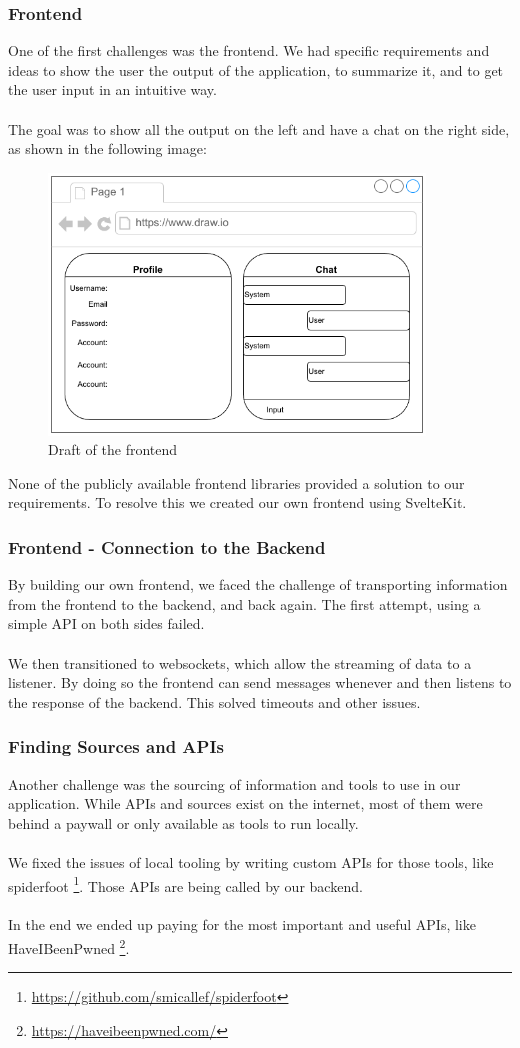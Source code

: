 \documentclass[
    a4paper,
    pagesize,
	pdftex,
    12pt,
]{scrartcl}
\begin{document}
\subsubsection{Frontend}
One of the first challenges was the frontend. We had specific requirements and ideas to show the user the output of the application, to summarize it, and to get the user input in an intuitive way.
\\ \\
The goal was to show all the output on the left and have a chat on the right side, as shown in the following image:
\begin{figure}[H]
	\centering
	\includegraphics[width=10cm]{Frontend-draft.png}
	\caption{Draft of the frontend}
	\label{fig:draft-frontend}
\end{figure} 
None of the publicly available frontend libraries provided a solution to our requirements. To resolve this we created our own frontend using SvelteKit.

\subsubsection{Frontend - Connection to the Backend}
By building our own frontend, we faced the challenge of transporting information from the frontend to the backend, and back again. The first attempt, using a simple API on both sides failed.
\\ \\
We then transitioned to websockets, which allow the streaming of data to a listener. By doing so the frontend can send messages whenever and then listens to the response of the backend. This solved timeouts and other issues.

\subsubsection{Finding Sources and APIs}
Another challenge was the sourcing of information and tools to use in our application. While APIs and sources exist on the internet, most of them were behind a paywall or only available as tools to run locally.
\\ \\
We fixed the issues of local tooling by writing custom APIs for those tools, like spiderfoot \footnote{\url{https://github.com/smicallef/spiderfoot}}. Those APIs are being called by our backend.
\\ \\
In the end we ended up paying for the most important and useful APIs, like HaveIBeenPwned  \footnote{\url{https://haveibeenpwned.com/}}.
\end{document}
